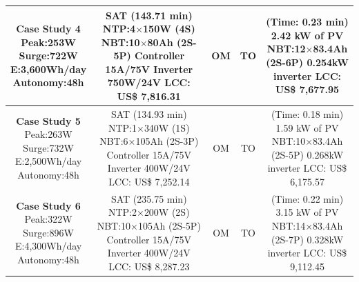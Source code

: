 \documentclass[runningheads]{llncs}
\begin{document}
\begin{table}[!t]
\begin{tabular}{|c|c|c|c|c|}
\hline
\makecell{\textbf{Case Study 4}\\Peak:253W\\Surge:722W\\E:3,600Wh/day\\Autonomy:48h} &  \makecell {SAT (143.71 min) \\NTP:4$\times$150W (4S)\\NBT:10$\times$80Ah (2S-5P)\\Controller 15A/75V\\Inverter 750W/24V \\LCC: US\$ 7,816.31} & OM & TO & \makecell{(Time: 0.23 min)\\2.42 kW of PV\\NBT:12$\times$83.4Ah (2S-6P)\\0.254kW inverter\\LCC: US\$ 7,677.95}\\
\hline
\makecell{\textbf{Case Study 5}\\Peak:263W\\Surge:732W\\E:2,500Wh/day\\Autonomy:48h} &  \makecell {SAT (134.93 min) \\NTP:1$\times$340W (1S)\\NBT:6$\times$105Ah (2S-3P)\\Controller 15A/75V\\Inverter 400W/24V \\LCC: US\$ 7,252.14} & OM & TO & \makecell{(Time: 0.18 min)\\1.59 kW of PV\\NBT:10$\times$83.4Ah (2S-5P)\\0.268kW inverter\\LCC: US\$ 6,175.57} \\
\hline
\makecell{\textbf{Case Study 6}\\Peak:322W\\Surge:896W\\E:4,300Wh/day\\Autonomy:48h} &  \makecell {SAT (235.75 min) \\NTP:2$\times$200W (2S)\\NBT:10$\times$105Ah (2S-5P)\\Controller 15A/75V\\Inverter 400W/24V \\LCC: US\$ 8,287.23} & OM & TO & \makecell{(Time: 0.22 min)\\3.15 kW of PV\\NBT:14$\times$83.4Ah (2S-7P)\\0.328kW inverter\\LCC: US\$ 9,112.45} \\

\end{tabular}
\end{table}
\end{document}
